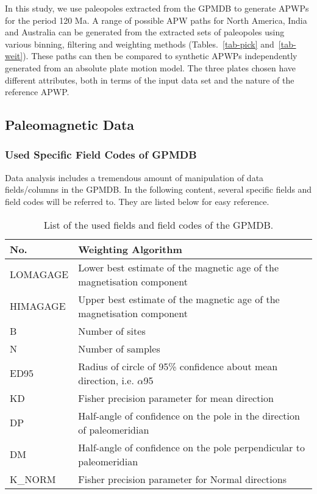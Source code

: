 In this study, we use paleopoles extracted from the GPMDB to generate APWPs for
the period 120 Ma. A range of possible APW paths for North America,
India and Australia can be generated from the extracted sets of paleopoles using
various binning, filtering and weighting methods (Tables.~\ref{tab-pick}
and~\ref{tab-weit}). These paths can then be compared to synthetic APWPs
independently generated from an absolute plate motion model. The three plates
chosen have different attributes, both in terms of the input data set and the
nature of the reference APWP.

\subsection{Paleomagnetic Data}

\subsubsection{Used Specific Field Codes of GPMDB}

Data analysis includes a tremendous amount of manipulation of data
fields/columns in the GPMDB\@. In the following content, several specific fields
and field codes will be referred to. They are listed below for easy reference.

\begin{table}
\centering
\caption{List of the used fields and field codes of the GPMDB.}\label{tab-fld}
\begin{tabular}{@{}ll@{}}
\toprule
No. & Weighting Algorithm \\ \midrule
LOMAGAGE & Lower best estimate of the magnetic age of the magnetisation component \\
HIMAGAGE & Upper best estimate of the magnetic age of the magnetisation component \\
B & Number of sites \\
N & Number of samples \\
ED95 & Radius of circle of 95\% confidence about mean direction, i.e. $\alpha$95 \\
KD & Fisher precision parameter for mean direction \\
DP & Half-angle of confidence on the pole in the direction of paleomeridian \\
DM & Half-angle of confidence on the pole perpendicular to paleomeridian \\
K\_NORM & Fisher precision parameter for Normal directions \\
  \bottomrule
\end{tabular}
\end{table}

